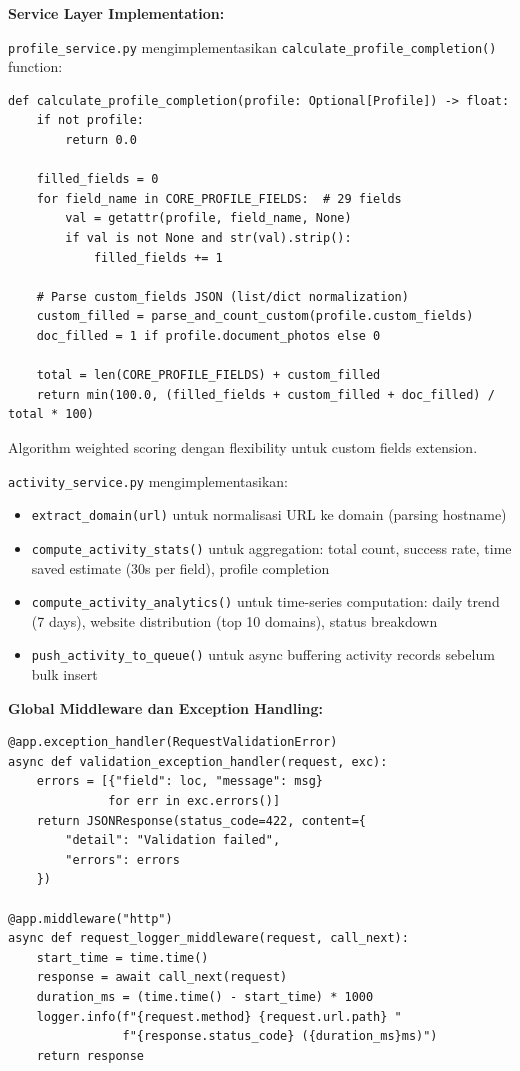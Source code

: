 \documentclass[12pt,a4paper]{article}
\begin{document}
\textbf{Service Layer Implementation:}

\texttt{profile\_service.py} mengimplementasikan \texttt{calculate\_profile\_completion()} function:

\begin{lstlisting}
def calculate_profile_completion(profile: Optional[Profile]) -> float:
    if not profile:
        return 0.0
    
    filled_fields = 0
    for field_name in CORE_PROFILE_FIELDS:  # 29 fields
        val = getattr(profile, field_name, None)
        if val is not None and str(val).strip():
            filled_fields += 1
    
    # Parse custom_fields JSON (list/dict normalization)
    custom_filled = parse_and_count_custom(profile.custom_fields)
    doc_filled = 1 if profile.document_photos else 0
    
    total = len(CORE_PROFILE_FIELDS) + custom_filled
    return min(100.0, (filled_fields + custom_filled + doc_filled) / total * 100)
\end{lstlisting}

Algorithm weighted scoring dengan flexibility untuk custom fields extension.

\texttt{activity\_service.py} mengimplementasikan:
\begin{itemize}
  \item \texttt{extract\_domain(url)} untuk normalisasi URL ke domain (parsing hostname)
  \item \texttt{compute\_activity\_stats()} untuk aggregation: total count, success rate, time saved estimate (30s per field), profile completion
  \item \texttt{compute\_activity\_analytics()} untuk time-series computation: daily trend (7 days), website distribution (top 10 domains), status breakdown
  \item \texttt{push\_activity\_to\_queue()} untuk async buffering activity records sebelum bulk insert
\end{itemize}

\textbf{Global Middleware dan Exception Handling:}

\begin{lstlisting}
@app.exception_handler(RequestValidationError)
async def validation_exception_handler(request, exc):
    errors = [{"field": loc, "message": msg} 
              for err in exc.errors()]
    return JSONResponse(status_code=422, content={
        "detail": "Validation failed",
        "errors": errors
    })

@app.middleware("http")
async def request_logger_middleware(request, call_next):
    start_time = time.time()
    response = await call_next(request)
    duration_ms = (time.time() - start_time) * 1000
    logger.info(f"{request.method} {request.url.path} "
                f"{response.status_code} ({duration_ms}ms)")
    return response
\end{lstlisting}
\end{document}
